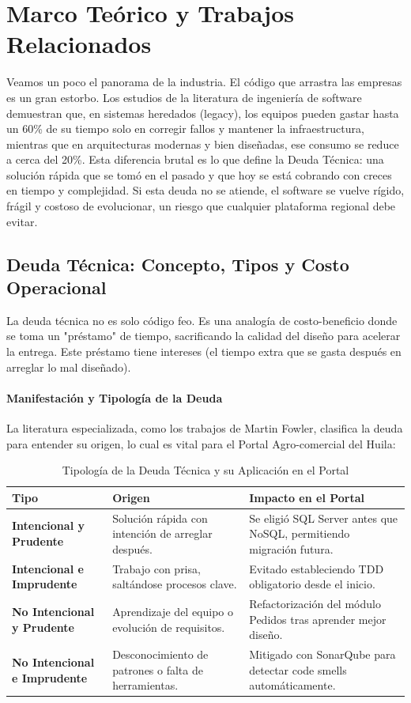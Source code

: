 \section{Marco Teórico y Trabajos Relacionados}

Veamos un poco el panorama de la industria. El código que arrastra las empresas es un gran estorbo. Los estudios de la literatura de ingeniería de software demuestran que, en sistemas heredados (legacy), los equipos pueden gastar hasta un 60\% de su tiempo solo en corregir fallos y mantener la infraestructura, mientras que en arquitecturas modernas y bien diseñadas, ese consumo se reduce a cerca del 20\%. Esta diferencia brutal es lo que define la Deuda Técnica: una solución rápida que se tomó en el pasado y que hoy se está cobrando con creces en tiempo y complejidad. Si esta deuda no se atiende, el software se vuelve rígido, frágil y costoso de evolucionar, un riesgo que cualquier plataforma regional debe evitar.

\subsection{Deuda Técnica: Concepto, Tipos y Costo Operacional}

La deuda técnica no es solo código feo. Es una analogía de costo-beneficio donde se toma un "préstamo" de tiempo, sacrificando la calidad del diseño para acelerar la entrega. Este préstamo tiene intereses (el tiempo extra que se gasta después en arreglar lo mal diseñado).

\paragraph{Manifestación y Tipología de la Deuda}

La literatura especializada, como los trabajos de Martin Fowler, clasifica la deuda para entender su origen, lo cual es vital para el Portal Agro-comercial del Huila:

\begin{table}[htbp]
\centering
\small
\begin{tabular}{|p{2.8cm}|p{3.5cm}|p{3.5cm}|}
\hline
\textbf{Tipo} & \textbf{Origen} & \textbf{Impacto en el Portal} \\
\hline
\textbf{Intencional y Prudente} & Solución rápida con intención de arreglar después. & Se eligió SQL Server antes que NoSQL, permitiendo migración futura. \\
\hline
\textbf{Intencional e Imprudente} & Trabajo con prisa, saltándose procesos clave. & Evitado estableciendo TDD obligatorio desde el inicio. \\
\hline
\textbf{No Intencional y Prudente} & Aprendizaje del equipo o evolución de requisitos. & Refactorización del módulo Pedidos tras aprender mejor diseño. \\
\hline
\textbf{No Intencional e Imprudente} & Desconocimiento de patrones o falta de herramientas. & Mitigado con SonarQube para detectar code smells automáticamente. \\
\hline
\end{tabular}
\caption{Tipología de la Deuda Técnica y su Aplicación en el Portal}
\end{table}

